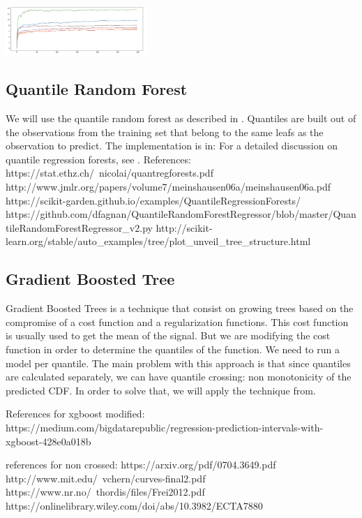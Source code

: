 \documentclass[a4paper,twocolumn,5p]{elsarticle}
\begin{document}
\includegraphics[width=0.4\textwidth]{kneighbor_crps}

\subsection{Quantile Random Forest}

We will use the quantile random forest as described in . Quantiles are built out of the observations 
from the training set that belong to the same leafs as the observation to predict. The implementation is in:
For a detailed discussion on quantile regression forests, see
\cite{meinshausen_quantile_2006}.
References:
         https://stat.ethz.ch/~nicolai/quantregforests.pdf
         http://www.jmlr.org/papers/volume7/meinshausen06a/meinshausen06a.pdf
         https://scikit-garden.github.io/examples/QuantileRegressionForests/
         https://github.com/dfagnan/QuantileRandomForestRegressor/blob/master/QuantileRandomForestRegressor_v2.py
         http://scikit-learn.org/stable/auto_examples/tree/plot_unveil_tree_structure.html

\subsection{Gradient Boosted Tree}

Gradient Boosted Trees is a technique that consist on growing trees based on the compromise 
of a cost function and a regularization functions. This cost function is usually used to get 
the mean of the signal. But we are modifying the cost function 
in order to determine the quantiles of the function. We need to run a model per quantile. 
The main problem with this approach is that since quantiles are calculated separately, 
we can have quantile crossing: non monotonicity of the predicted
CDF. In order to solve that, we will apply the technique from.

References for xgboost modified:
    https://medium.com/bigdatarepublic/regression-prediction-intervals-with-xgboost-428e0a018b

references for non crossed:
    https://arxiv.org/pdf/0704.3649.pdf
    http://www.mit.edu/~vchern/curves-final2.pdf
    https://www.nr.no/~thordis/files/Frei2012.pdf
    https://onlinelibrary.wiley.com/doi/abs/10.3982/ECTA7880
\end{document}
